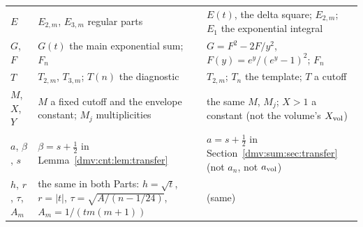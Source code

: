 \documentclass[11pt,letterpaper]{article}
\numberwithin{equation}{section}
\theoremstyle{definition}\newtheorem{definition}[theorem]{Definition}
\theoremstyle{remark}\newtheorem{remark}[theorem]{Remark}
\begin{document}
\begin{longtable}{@{}>{\raggedright\arraybackslash}p{0.75in}>{\raggedright\arraybackslash}p{2.55in}>{\raggedright\arraybackslash}p{2.55in}@{}}
$E$ & $E_{2,m}$, $E_{3,m}$ regular parts & $E(t)$, the delta square; $E_{2,m}$; $E_1$ the exponential integral\\
$G$, $F$ & $G(t)$ the main exponential sum; $F_n$ & $G=F^2-2F/y^2$, $F(y)=e^y/(e^y-1)^2$; $F_n$\\
$T$ & $T_{2,m}$, $T_{3,m}$; $T(n)$ the diagnostic & $T_{2,m}$; $T_n$ the template; $T$ a cutoff\\
$M$, $X$, $Y$ & $M$ a fixed cutoff and the envelope constant; $M_j$ multiplicities & the same $M$, $M_j$; $X>1$ a constant (not the volume's $X_{\rm vol}$)\\
$a$, $\beta$, $s$ & $\beta=s+\tfrac12$ in Lemma~\ref{dmv:cnt:lem:transfer} & $a=s+\tfrac12$ in Section~\ref{dmv:sum:sec:transfer} (not $a_n$, not $a_{\rm vol}$)\\
$h$, $r$, $\tau$, $A_m$ & the same in both Parts: $h=\sqrt t$, $r=|t|$, $\tau=\sqrt{A/(n-1/24)}$, $A_m=1/(tm(m+1))$ & (same)\\
\bottomrule
\end{longtable}
\addtocounter{table}{-1}%
\endgroup
\clearpage
\end{document}
